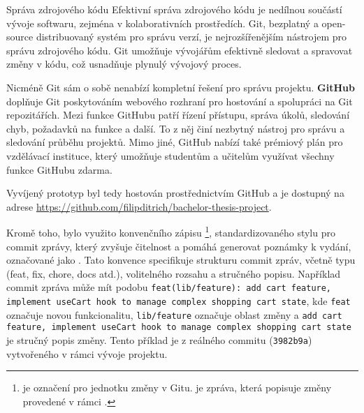 \begin{subsection}{Správa zdrojového kódu}
    \label{subsec:implementace-sprava-zdrojoveho-kodu}
    Efektivní správa zdrojového kódu je nedílnou součástí vývoje softwaru, zejména v kolaborativních prostředích.
    Git, bezplatný a open-source distribuovaný systém pro správu verzí, je nejrozšířenějším nástrojem pro správu zdrojového kódu.
    Git umožňuje vývojářům efektivně sledovat a spravovat změny v kódu, což usnadňuje plynulý vývojový proces\cite{g__git_scm_com}.

    Nicméně Git sám o sobě nenabízí kompletní řešení pro správu projektu.
    \textbf{GitHub} doplňuje Git poskytováním webového rozhraní pro hostování a spolupráci na Git repozitářích.
    Mezi funkce GitHubu patří řízení přístupu, správa úkolů, sledování chyb, požadavků na funkce a další\cite{g_github_com_about}.
    To z něj činí nezbytný nástroj pro správu a sledování průběhu projektů.
    Mimo jiné, GitHub nabízí také prémiový plán pro vzdělávací instituce, který umožňuje studentům a učitelům využívat všechny funkce GitHubu zdarma\cite{e_education_github_com_pack}.

    Vyvíjený prototyp byl tedy hostován prostřednictvím GitHub a je dostupný na adrese \url{https://github.com/filipditrich/bachelor-thesis-project}.

    Kromě toho, bylo využito konvenčního zápisu \footnote{ je označení pro jednotku změny v Gitu.  je zpráva, která popisuje změny provedené v rámci .}, standardizovaného stylu pro commit zprávy, který zvyšuje čitelnost a pomáhá generovat poznámky k vydání, označované jako .
    Tato konvence specifikuje strukturu commit zpráv, včetně typu (feat, fix, chore, docs atd.), volitelného rozsahu a stručného popisu.
    Například commit zpráva může mít podobu \texttt{feat(lib/feature): add cart feature, implement useCart hook to manage complex shopping cart state}, kde \texttt{feat} označuje novou funkcionalitu, \texttt{lib/feature} označuje oblast změny a \texttt{add cart feature, implement useCart hook to manage complex shopping cart state} je stručný popis změny.
    Tento příklad je z reálného commitu (\texttt{3982b9a}) vytvořeného v rámci vývoje projektu.
\end{subsection}

